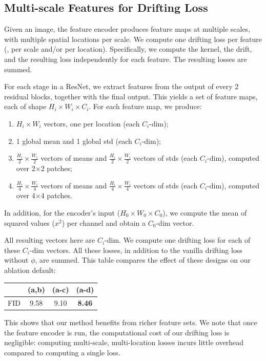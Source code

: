\subsection{Multi-scale Features for Drifting Loss}
\label{sec:appendix_feature_extraction}

Given an image, the feature encoder produces feature maps at multiple scales, with multiple spatial locations per scale.
We compute one drifting loss per feature (\eg, per scale and/or per location).
Specifically, we compute the kernel, the drift, and the resulting loss independently for each feature. The resulting losses are summed.

For each stage in a ResNet, we extract features from the output of every 2 residual blocks, together with the final output.
This yields a set of feature maps, each of shape $H_i{\times}W_i{\times}C_i$. For each feature map, we produce:
\begin{enumerate}[itemsep=2pt, topsep=2pt, parsep=4pt, partopsep=4pt,label=(\alph*)]
    \item $H_i{\times}W_i$ vectors, one per location (each $C_i$-dim);
    \item 1 global mean and 1 global std (each $C_i$-dim);
    \item $\frac{H_i}{2}{\times}\frac{W_i}{2}$ vectors of means and $\frac{H_i}{2}{\times}\frac{W_i}{2}$ vectors of stds (each $C_i$-dim), computed over 2${\times}$2 patches;
    \item $\frac{H_i}{4}{\times}\frac{W_i}{4}$ vectors of means and $\frac{H_i}{4}{\times}\frac{W_i}{4}$ vectors of stds (each $C_i$-dim), computed over 4${\times}$4 patches.
\end{enumerate}
In addition, for the encoder's input ($H_0{\times}W_0{\times}C_0$), we compute the mean of squared values ($x^2$) per channel and obtain a $C_0$-dim vector.

All resulting vectors here are $C_i$-dim.
We compute one drifting loss for each of these $C_i$-dim vectors. All these losses, in addition to the vanilla drifting loss without $\phi$, are summed.
This table compares the effect of these designs on our ablation default:
\begin{center}
\tablefontsize
\begin{tabular}{c|ccc}
\toprule
 & (a,b) & (a-c) & (a-d) \\
\midrule
FID & 9.58 & 9.10 & \textbf{8.46} \\
\bottomrule
\end{tabular}
\end{center}
This shows that our method benefits from richer feature sets.
We note that once the feature encoder is run, the computational cost of our drifting loss is negligible: computing multi-scale, multi-location losses incurs little overhead compared to computing a single loss.


